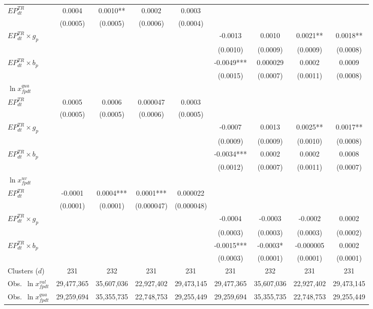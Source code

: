 \begin{table}[htbp]
\begin{threeparttable}
\begin{tabular}{lcccccccc}
\quad $EP^{TR}_{dt}$ & 0.0004 & 0.0010** & 0.0002 & 0.0003 &  &  &  &  \\
 & (0.0005) & (0.0005) & (0.0006) & (0.0004) &  &  &  &  \\
\quad $EP^{TR}_{dt} \times g_p$ &  &  &  &  & -0.0013 & 0.0010 & 0.0021** & 0.0018** \\
 &  &  &  &  & (0.0010) & (0.0009) & (0.0009) & (0.0008) \\
\quad $EP^{TR}_{dt} \times b_p$ &  &  &  &  & -0.0049*** & 0.000029 & 0.0002 & 0.0009 \\
 &  &  &  &  & (0.0015) & (0.0007) & (0.0011) & (0.0008) \\[3pt]
\multicolumn{9}{l}{\quad $\ln x^{qua}_{fpdt}$} \\
\quad $EP^{TR}_{dt}$ & 0.0005 & 0.0006 & 0.000047 & 0.0003 &  &  &  &  \\
 & (0.0005) & (0.0005) & (0.0006) & (0.0005) &  &  &  &  \\
\quad $EP^{TR}_{dt} \times g_p$ &  &  &  &  & -0.0007 & 0.0013 & 0.0025** & 0.0017** \\
 &  &  &  &  & (0.0009) & (0.0009) & (0.0010) & (0.0008) \\
\quad $EP^{TR}_{dt} \times b_p$ &  &  &  &  & -0.0034*** & 0.0002 & 0.0002 & 0.0008 \\
 &  &  &  &  & (0.0012) & (0.0007) & (0.0011) & (0.0007) \\[3pt]
\multicolumn{9}{l}{\quad $\ln x^{uv}_{fpdt}$} \\
\quad $EP^{TR}_{dt}$ & -0.0001 & 0.0004*** & 0.0001*** & 0.000022 &  &  &  &  \\
 & (0.0001) & (0.0001) & (0.000047) & (0.000048) &  &  &  &  \\
\quad $EP^{TR}_{dt} \times g_p$ &  &  &  &  & -0.0004 & -0.0003 & -0.0002 & 0.0002 \\
 &  &  &  &  & (0.0003) & (0.0003) & (0.0003) & (0.0002) \\
\quad $EP^{TR}_{dt} \times b_p$ &  &  &  &  & -0.0015*** & -0.0003* & -0.000005 & 0.0002 \\
 &  &  &  &  & (0.0003) & (0.0001) & (0.0001) & (0.0001) \\[3pt]
\midrule
Clusters ($d$) & 231 & 232 & 231 & 231 & 231 & 232 & 231 & 231 \\
Obs.\ $\ln x^{val}_{fpdt}$ & 29,477,365 & 35,607,036 & 22,927,402 & 29,473,145 & 29,477,365 & 35,607,036 & 22,927,402 & 29,473,145 \\
Obs.\ $\ln x^{qua}_{fpdt}$ & 29,259,694 & 35,355,735 & 22,748,753 & 29,255,449 & 29,259,694 & 35,355,735 & 22,748,753 & 29,255,449 \\

\end{tabular}
\end{threeparttable}
\end{table}
